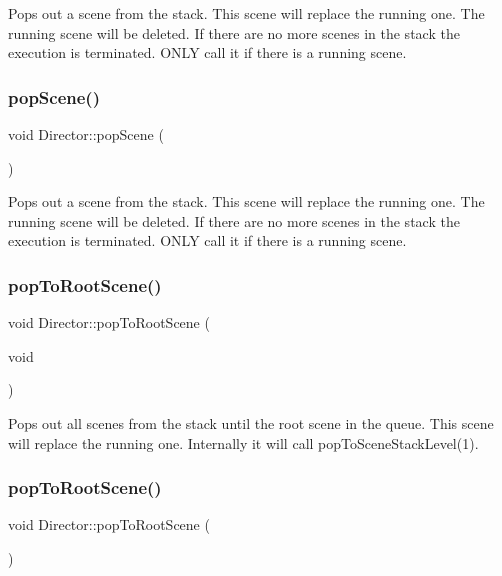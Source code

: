 Pops out a scene from the stack. This scene will replace the running one. The running scene will be deleted. If there are no more scenes in the stack the execution is terminated. O\+N\+LY call it if there is a running scene. \mbox{\label{classDirector_a92916c5c47d0f0a202fe1a5023841e8b}} 
\subsubsection{\texorpdfstring{pop\+Scene()}{popScene()}\hspace{0.1cm}{\footnotesize\ttfamily [2/2]}}
{\footnotesize\ttfamily void Director\+::pop\+Scene (\begin{DoxyParamCaption}{ }\end{DoxyParamCaption})}

Pops out a scene from the stack. This scene will replace the running one. The running scene will be deleted. If there are no more scenes in the stack the execution is terminated. O\+N\+LY call it if there is a running scene. \mbox{\label{classDirector_a3990819e9d112e26258290ca82d91999}} 
\subsubsection{\texorpdfstring{pop\+To\+Root\+Scene()}{popToRootScene()}\hspace{0.1cm}{\footnotesize\ttfamily [1/2]}}
{\footnotesize\ttfamily void Director\+::pop\+To\+Root\+Scene (\begin{DoxyParamCaption}\item[{void}]{ }\end{DoxyParamCaption})}

Pops out all scenes from the stack until the root scene in the queue. This scene will replace the running one. Internally it will call {\ttfamily pop\+To\+Scene\+Stack\+Level(1)}. \mbox{\label{classDirector_a3990819e9d112e26258290ca82d91999}} 
\subsubsection{\texorpdfstring{pop\+To\+Root\+Scene()}{popToRootScene()}\hspace{0.1cm}{\footnotesize\ttfamily [2/2]}}
{\footnotesize\ttfamily void Director\+::pop\+To\+Root\+Scene (\begin{DoxyParamCaption}{ }\end{DoxyParamCaption})}

